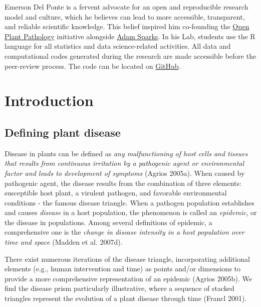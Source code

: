 \documentclass[
  letterpaper,
]{book}
\begin{document}
Emerson Del Ponte is a fervent advocate for an open and reproducible
research model and culture, which he believes can lead to more
accessible, transparent, and reliable scientific knowledge. This belief
inspired him co-founding the
\href{http://www.openplantpathology.org/}{Open Plant Pathology}
initiative alongside \href{http://adamhsparks.netlify.app/}{Adam
Sparks}. In his Lab, students use the R language for all statistics and
data science-related activities. All data and computational codes
generated during the research are made accessible before the peer-review
process. The code can be located on
\href{https://github.com/emdelponte}{GitHub}.


\hypertarget{introduction}{%
\chapter{Introduction}\label{introduction}}

\hypertarget{defining-plant-disease}{%
\section{Defining plant disease}\label{defining-plant-disease}}

Disease in plants can be defined as \emph{any malfunctioning of host
cells and tissues that results from continuous irritation by a
pathogenic agent or environmental factor and leads to development of
symptoms} (Agrios 2005a). When caused by pathogenic agent, the disease
results from the combination of three elements: susceptible host plant,
a virulent pathogen, and favorable environmental conditions - the famous
disease triangle. When a pathogen population establishes and causes
\emph{disease} in a host population, the phenomenon is called an
\emph{epidemic}, or the disease in populations. Among several
definitions of epidemic, a comprehensive one is the \emph{change in
disease intensity in a host population over time and space} (Madden et
al. 2007d).

There exist numerous iterations of the disease triangle, incorporating
additional elements (e.g., human intervention and time) as points and/or
dimensions to provide a more comprehensive representation of an epidemic
(Agrios 2005b). We find the disease prism particularly illustrative,
where a sequence of stacked triangles represent the evolution of a plant
disease through time (Francl 2001).
\end{document}
